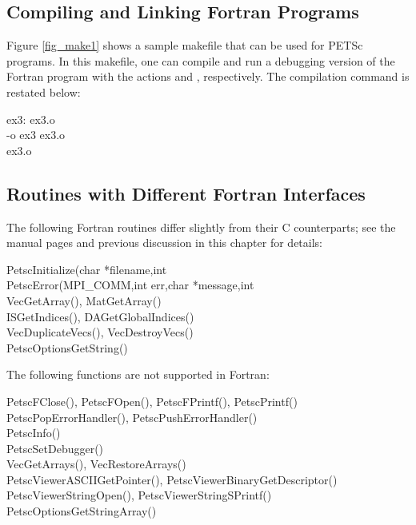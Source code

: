 \subsection{Compiling and Linking Fortran Programs}
\label{sec_fortcompile}

Figure \ref{fig_make1} shows a sample makefile that can be used for
PETSc programs.  In this makefile, one can compile and run a debugging version
of the Fortran program  with the actions    and
 , respectively. The compilation command is restated below:
\begin{tabbing}
   ex3: ex3.o \\
    -o ex3 ex3.o \\
    ex3.o
\end{tabbing}

\subsection{Routines with Different Fortran Interfaces}
\label{sec_fortran_exceptions}

The following Fortran routines differ slightly from their C counterparts; see the 
manual pages and previous discussion in this chapter for details:
\begin{tabbing}
 PetscInitialize(char *filename,int \\
 PetscError(MPI\_COMM,int err,char *message,int \\
 VecGetArray(), MatGetArray()\\
 ISGetIndices(), DAGetGlobalIndices()\\
 VecDuplicateVecs(), VecDestroyVecs()\\
 PetscOptionsGetString()
\end{tabbing}
The following functions are not supported in Fortran:
\begin{tabbing}
 PetscFClose(), PetscFOpen(), PetscFPrintf(), PetscPrintf()\\
 PetscPopErrorHandler(), PetscPushErrorHandler()\\
 PetscInfo()\\
 PetscSetDebugger()\\
 VecGetArrays(), VecRestoreArrays()\\
 PetscViewerASCIIGetPointer(), PetscViewerBinaryGetDescriptor()\\
 PetscViewerStringOpen(), PetscViewerStringSPrintf()\\
 PetscOptionsGetStringArray()
\end{tabbing}

